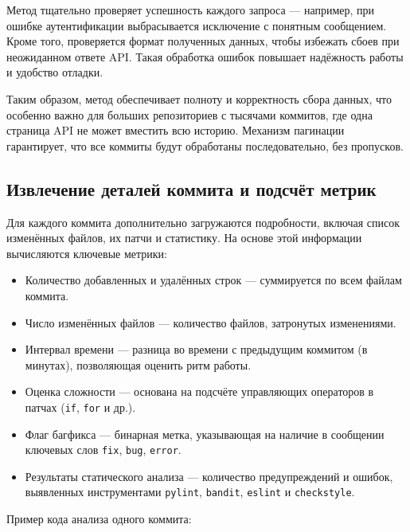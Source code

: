 Метод тщательно проверяет успешность каждого запроса — например, при ошибке аутентификации выбрасывается исключение с понятным сообщением. Кроме того, проверяется формат полученных данных, чтобы избежать сбоев при неожиданном ответе API. Такая обработка ошибок повышает надёжность работы и удобство отладки.

Таким образом, метод обеспечивает полноту и корректность сбора данных, что особенно важно для больших репозиториев с тысячами коммитов, где одна страница API не может вместить всю историю. Механизм пагинации гарантирует, что все коммиты будут обработаны последовательно, без пропусков.

\subsection{Извлечение деталей коммита и подсчёт метрик}

Для каждого коммита дополнительно загружаются подробности, включая список изменённых файлов, их патчи и статистику. На основе этой информации вычисляются ключевые метрики:

\begin{itemize}
	\item Количество добавленных и удалённых строк — суммируется по всем файлам коммита.
	\item Число изменённых файлов — количество файлов, затронутых изменениями.
	\item Интервал времени — разница во времени с предыдущим коммитом (в минутах), позволяющая оценить ритм работы.
	\item Оценка сложности — основана на подсчёте управляющих операторов в патчах (\verb|if|, \verb|for| и др.).
	\item Флаг багфикса — бинарная метка, указывающая на наличие в сообщении ключевых слов \verb|fix|, \verb|bug|, \verb|error|.
	\item Результаты статического анализа — количество предупреждений и ошибок, выявленных инструментами \verb|pylint|, \verb|bandit|, \verb|eslint| и \verb|checkstyle|.
\end{itemize}

Пример кода анализа одного коммита:

